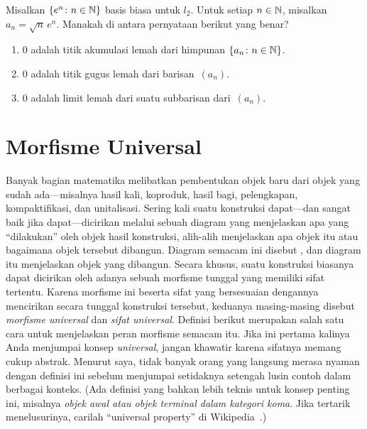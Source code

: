 \begin{exer} Misalkan $\{e^n\colon n \in \mathbb{N}\}$ basis biasa untuk $l_2$. Untuk
setiap $n \in \mathbb{N}$, misalkan $a_n = \sqrt n\, e^n$. Manakah di antara pernyataan berikut
yang benar?
 \begin{enumerate}
  \item $0$ adalah titik akumulasi lemah dari himpunan
$\{a_n\colon n \in \mathbb{N}\}$.
  \item $0$ adalah titik gugus lemah dari barisan~$(a_n)$.
  \item $0$ adalah limit lemah dari suatu subbarisan dari~$(a_n)$.
 \end{enumerate}
\end{exer}










\section{Morfisme Universal}
Banyak bagian matematika melibatkan pembentukan objek baru dari objek yang sudah ada---misalnya
hasil kali, koproduk, hasil bagi, pelengkapan, kompaktifikasi, dan unitalisasi.
Sering kali suatu konstruksi dapat---dan sangat baik jika dapat---dicirikan melalui
sebuah diagram yang menjelaskan apa yang “dilakukan” oleh objek hasil konstruksi, alih-alih
menjelaskan apa objek itu atau bagaimana objek tersebut dibangun. Diagram semacam ini disebut
, dan diagram itu menjelaskan
 objek yang dibangun.
Secara khusus, suatu konstruksi biasanya dapat dicirikan oleh adanya
sebuah morfisme tunggal yang memiliki sifat tertentu. Karena morfisme ini beserta
sifat yang bersesuaian dengannya mencirikan secara tunggal konstruksi tersebut, keduanya masing-masing
disebut \emph{morfisme universal} dan \emph{sifat universal}. Definisi berikut
merupakan salah satu cara untuk menjelaskan peran morfisme semacam itu. Jika ini pertama kalinya Anda
menjumpai konsep \emph{universal}, jangan khawatir karena sifatnya memang cukup abstrak. Menurut saya,
tidak banyak orang yang langsung merasa nyaman dengan definisi ini sebelum menjumpai setidaknya
setengah lusin contoh dalam berbagai konteks. (Ada definisi yang bahkan lebih teknis untuk konsep
penting ini, misalnya \emph{objek awal atau objek terminal dalam kategori koma}. Jika tertarik
menelusurinya, carilah “universal property” di Wikipedia~\cite{wiki:xxx}.)

